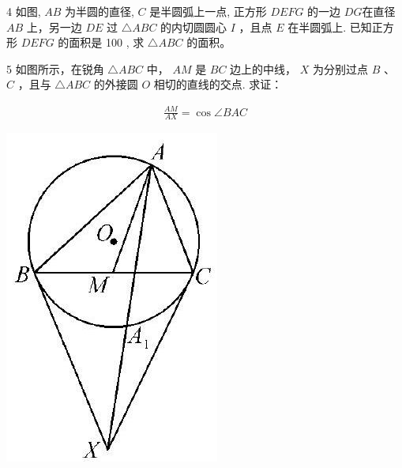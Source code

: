 \documentclass[10pt]{article}
\begin{document}
4 如图, $A B$ 为半圆的直径, $C$ 是半圆弧上一点, 正方形 $D E F G$ 的一边 $D G$在直径 $A B$ 上，另一边 $D E$ 过 $\triangle A B C$ 的内切圆圆心 $I$ ，且点 $E$ 在半圆弧上. 已知正方形 $D E F G$ 的面积是 100 , 求 $\triangle A B C$ 的面积。

5 如图所示，在锐角 $\triangle A B C$ 中， $A M$ 是 $B C$ 边上的中线， $X$ 为分别过点 $B$ 、 $C$ ，且与 $\triangle A B C$ 的外接圆 $O$ 相切的直线的交点. 求证：

\begin{align*}
\frac{A M}{A X}=\cos \angle B A C
\end{align*}

\includegraphics[max width=\textwidth, center]{2024_10_30_66b8e5e701da2093c133g-078}\\
\end{document}
